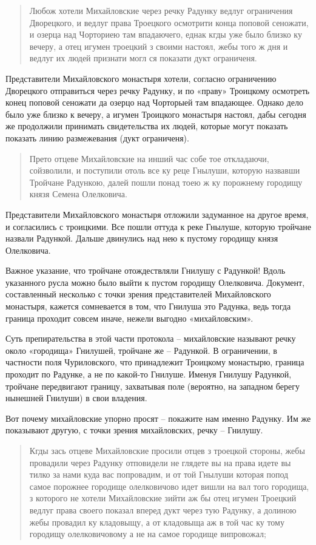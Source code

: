 \begin{quotation}
Любож хотели Михайловские через речку Радунку ведлуг ограничения Дворецкого, и ведлуг права Троецкого осмотрити конца поповой сеножати, и озерца над Чорториею там впадаючего, еднак кгды уже было близко ку вечеру, а отец игумен троецкий з своими настоял, жебы того ж дня и ведлуг их людей признати могл ся показати дукт ограниченя.
\end{quotation}

Представители Михайловского монастыря хотели, согласно ограничению Дворецкого отправиться через речку Радунку, и по «праву» Троицкому осмотреть конец поповой сеножати да озерцо над Чорторыей там впадающее. Однако дело было уже близко к вечеру, а игумен Троицкого монастыря настоял, дабы сегодня же продолжили принимать свидетельства их людей, которые могут показать показать линию размежевания (дукт ограниченя).   

\begin{quotation}
Прето отцеве Михайловские на инший час собе тое откладаючи, сойзволили, и поступили отоль все ку реце Гнылуши, которую назвавши Тройчане Радункою, далей пошли понад тоею ж ку порожнему городищу князя Семена Олелковича.
\end{quotation}

Представители Михайловского монастыря отложили задуманное на другое время, и согласились с троицкими. Все пошли оттуда к реке Гнылуше, которую тройчане назвали Радункой. Дальше двинулись над нею к пустому городищу князя Олелковича.

Важное указание, что тройчане отождествляли Гнилушу с Радункой! Вдоль указанного русла можно было выйти к пустом городищу Олелковича. Документ, составленный несколько с точки зрения представителей Михайловского монастыря, кажется сомневается в том, что Гнилуша это Радунка, ведь тогда граница проходит совсем иначе, нежели выгодно «михайловским».

Суть препирательства в этой части протокола – михайловские называют речку около «городища» Гнилушей, тройчане же – Радункой. В ограничении, в частности поля Чуриловского, что принадлежит Троицкому монастырю, граница проходит по Радунке, а не по какой-то Гнилуше. Именуя Гнилушу Радункой, тройчане передвигают границу, захватывая поле (вероятно, на западном берегу нынешней Гнилуши) в свои владения.

Вот почему михайловские упорно просят – покажите нам именно Радунку. Им же показывают другую, с точки зрения михайловских, речку – Гнилушу.

\begin{quotation}
Кгды зась отцеве Михайловские просили отцев з троецкой стороны, жебы провадили через Радунку отповидели не глядете вы на права идете вы тилко за нами куда вас попровадим, и от той Гнылуши которая попод самое порожнее городище олелковичово идет вишли на вал того городища, з которого не хотели Михайловские зийти аж бы отец игумен Троецкий ведлуг права своего показал вперед дукт через тую Радунку, а долиною жебы провадил ку кладовыщу, а от кладовыща аж в той час ку тому городищу олелковичовому а не на самое городище випровожал;
\end{quotation}

